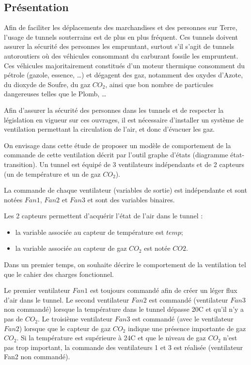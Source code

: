 \documentclass[10pt]{article}
\begin{document}
\subsection*{Présentation}
Afin de faciliter les déplacements des marchandises et des personnes sur Terre, l’usage de
tunnels souterrains est de plus en plus fréquent. Ces tunnels doivent assurer la sécurité des
personnes les empruntant, surtout s’il s’agit de tunnels autoroutiers où des véhicules
consommant du carburant fossile les empruntent. Ces véhicules majoritairement constitués
d’un moteur thermique consomment du pétrole (gazole, essence, …) et dégagent des gaz,
notamment des oxydes d’Azote, du dioxyde de Soufre, du gaz $CO_2$, ainsi que bon nombre de
particules dangereuses telles que le Plomb, …

Afin d’assurer la sécurité des personnes dans les tunnels et de respecter la législation en vigueur
sur ces ouvrages, il est nécessaire d’installer un système de ventilation permettant la circulation
de l’air, et donc d’évacuer les gaz.

On envisage dans cette étude de proposer un modèle de comportement de la commande de cette
ventilation décrit par l’outil graphe d’états (diagramme état-transition). Un tunnel est équipé de
3 ventilateurs indépendants et de 2 capteurs (un de température et un de gaz $CO_2$).

La commande de chaque ventilateur (variables de sortie) est indépendante et sont notées
$Fan1$, $Fan2$ et $Fan3$ et sont des variables binaires.

Les 2 capteurs permettent d’acquérir l’état de l’air dans le tunnel :
\begin{itemize}
\item la variable associée au capteur de température est $temp$;
\item la variable associée au capteur de gaz $CO_2$ est notée $CO2$.
\end{itemize}

Dans un premier temps, on souhaite décrire le comportement de la ventilation tel que le cahier
des charges fonctionnel.

Le premier ventilateur $Fan1$ est toujours commandé afin de créer un léger flux d’air dans le
tunnel. Le second ventilateur $Fan2$ est commandé (ventilateur $Fan3$ non commandé) lorsque la
température dans le tunnel dépasse 20\textdegree C et qu’il n’y a pas de $CO_2$. Le troisième ventilateur $Fan3$
est commandé (avec le ventilateur $Fan2$) lorsque que le capteur de gaz $CO_2$ indique une
présence importante de gaz $CO_2$. Si la température est supérieure à 24\textdegree C et que le niveau de gaz
$CO_2$ n’est pas trop important, la commande des ventilateurs 1 et 3 est réalisée (ventilateur Fan2
non commandé).
\end{document}
